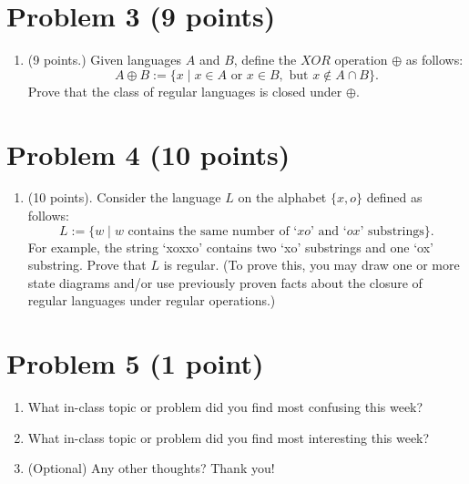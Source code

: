 \documentclass[letterpaper,11pt,twoside]{article}
\theoremstyle{plain}
\theoremstyle{definition}
\theoremstyle{remark}
\theoremstyle{restate}
\begin{document}
\clearpage
\section{Problem 3 (9 points)}

\begin{enumerate}
    \item (9 points.) Given languages $A$ and $B$, define the $XOR$ operation $\oplus$ as follows:
    \[
        A \oplus B := \{x \; | \; x \in A \text{ or } x \in B, \text{ but } x \not\in A \cap B\}.
    \]
    Prove that the class of regular languages is closed under $\oplus$.

\end{enumerate}

\clearpage
\section{Problem 4 (10 points)}

\begin{enumerate}
    \item (10 points). Consider the language $L$ on the alphabet $\{x, o\}$ defined as follows:
    \[
        L := \{w \; | \; w \text{ contains the same number of `$xo$' and `$ox$' substrings} \}.
    \]
    For example, the string `xoxxo' contains two `xo' substrings and one `ox' substring. Prove that $L$ is regular. (To prove this, you may draw one or more state diagrams and/or use previously proven facts about the closure of regular languages under regular operations.)
\end{enumerate}



\clearpage
\section{Problem 5 (1 point)}
    \begin{enumerate}
        \item What in-class topic or problem did you find most confusing this week?
        
        \item What in-class topic or problem did you find most interesting this week?
        
        \item (Optional) Any other thoughts? Thank you!
    \end{enumerate}
\end{document}
